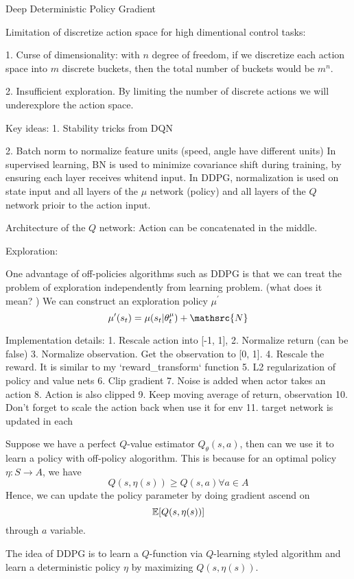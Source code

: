 \documentclass{article}
\begin{document}
Deep Deterministic Policy Gradient

Limitation of discretize action space for high dimentional control tasks:

1. Curse of dimensionality: with $n$ degree of freedom, if we discretize
each action space into $m$ discrete buckets, then the total number of 
buckets would be $m^n$.

2. Insufficient exploration. By limiting the number of discrete actions
we will underexplore the action space. 


Key ideas:
1. Stability tricks from DQN

2. Batch norm to normalize feature units (speed, angle have different 
units)
In supervised learning, BN is used to minimize covariance shift during 
training, by ensuring each layer receives whitend input. 
In DDPG, normalization is used on state input and all layers of the 
$\mu$ network (policy) and all layers of the $Q$ network prioir to 
the action input. 

Architecture of the $Q$ network:
Action can be concatenated in the middle. 

Exploration:

One advantage of off-policies algorithms such as DDPG is that we can treat 
the problem of exploration independently from learning problem. (what does 
it mean? )
We can construct an exploration policy $\mu^{\prime}$ 
\[
    \mu^{\prime}(s_t) = \mu(s_t | \theta^{\mu}_t) + \mathsrc{N}
\]


Implementation details:
1. Rescale action into [-1, 1], 
2. Normalize return (can be false)
3. Normalize observation. Get the observation to [0, 1].
4. Rescale the reward. It is similar to my `reward_transform` function
5. L2 regularization of policy and value nets
6. Clip gradient
7. Noise is added when actor takes an action
8. Action is also clipped
9. Keep moving average of return, observation
10. Don't forget to scale the action back when use it for env
11. target network is updated in each 

Suppose we have a perfect $Q$-value estimator $Q_{\theta}(s, a)$, then
can we use it to learn a policy with off-policy alogorithm. This is 
because for an optimal policy $\eta : S \rightarrow A$, we have 
\[
    Q(s, \eta(s)) \geq Q(s, a) \forall a \in A
\]
Hence, we can update the policy parameter by doing gradient ascend on
\[
    \mathbb{E}[Q(s, \eta(s))]
\]
through $a$ variable. 


The idea of DDPG is to learn a $Q$-function via $Q$-learning styled 
algorithm and learn a deterministic policy $\eta$ by maximizing 
$Q(s, \eta(s))$. 
\end{document}
